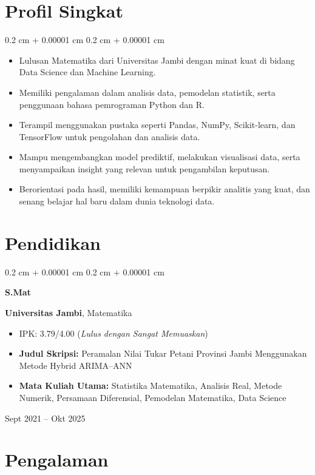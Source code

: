 \documentclass[10pt, letterpaper]{article}
\newenvironment{highlights}{
    \begin{itemize}[
        topsep=0.10 cm,
        parsep=0.10 cm,
        partopsep=0pt,
        itemsep=0pt,
        leftmargin=0.4 cm + 10pt
    ]
}{
    \end{itemize}
} %
\newenvironment{highlightsforbulletentries}{
    \begin{itemize}[
        topsep=0.10 cm,
        parsep=0.10 cm,
        partopsep=0pt,
        itemsep=0pt,
        leftmargin=10pt
    ]
}{
    \end{itemize}
} %
\newenvironment{onecolentry}{
    \begin{adjustwidth}{
        0.2 cm + 0.00001 cm
    }{
        0.2 cm + 0.00001 cm
    }
}{
    \end{adjustwidth}
} %
\newenvironment{threecolentry}[3][]{
    \onecolentry
    \def\thirdColumn{#3}
    \setcolumnwidth{1 cm, \fill, 4.5 cm}
    \begin{paracol}{3}
    {\raggedright #2} \switchcolumn
}{
    \switchcolumn \raggedleft \thirdColumn
    \end{paracol}
    \endonecolentry
} %
\begin{document}
    
    \section{Profil Singkat}

\begin{onecolentry}
    \begin{highlightsforbulletentries}

    \item Lulusan Matematika dari Universitas Jambi dengan minat kuat di bidang Data Science dan Machine Learning.
    \item Memiliki pengalaman dalam analisis data, pemodelan statistik, serta penggunaan bahasa pemrograman Python dan R.
    \item Terampil menggunakan pustaka seperti Pandas, NumPy, Scikit-learn, dan TensorFlow untuk pengolahan dan analisis data.
    \item Mampu mengembangkan model prediktif, melakukan visualisasi data, serta menyampaikan insight yang relevan untuk pengambilan keputusan.
    \item Berorientasi pada hasil, memiliki kemampuan berpikir analitis yang kuat, dan senang belajar hal baru dalam dunia teknologi data.

    \end{highlightsforbulletentries}
\end{onecolentry}


  \section{Pendidikan}

\begin{threecolentry}{\textbf{S.Mat}}{
    Sept 2021 – Okt 2025
}
    \textbf{Universitas Jambi}, Matematika
    \begin{highlights}
        \item IPK: 3.79/4.00 (\textit{Lulus dengan Sangat Memuaskan})
        \item \textbf{Judul Skripsi:} Peramalan Nilai Tukar Petani Provinsi Jambi Menggunakan Metode Hybrid ARIMA–ANN
        \item \textbf{Mata Kuliah Utama:} Statistika Matematika, Analisis Real, Metode Numerik, Persamaan Diferensial, Pemodelan Matematika, Data Science
    \end{highlights}
\end{threecolentry}



    
    \section{Pengalaman}
\end{document}
